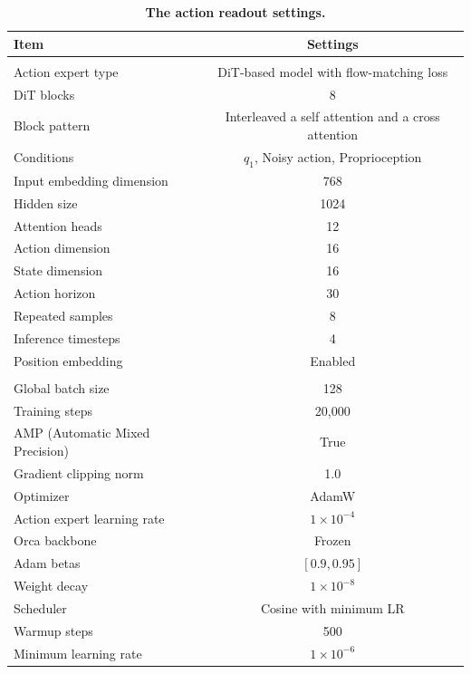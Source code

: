 \begin{table}[!htbp] 
\centering 
\caption{\textbf{The action readout settings.}} \label{tab:appendix_action_readout_settings} 
\begin{tabular}{lc} 
\toprule[1pt]
\textbf{Item} & \textbf{Settings} \\ 
\midrule
\rowcolor[rgb]{ .949,  .949,  .949}\multicolumn{2}{l}{\textit{Architecture}} \\
Action expert type & DiT-based model with flow-matching loss \\ 
DiT blocks & 8 \\ 
Block pattern & Interleaved a self attention and a cross attention \\
Conditions & \(q_{1}\), Noisy action, Proprioception \\ 
Input embedding dimension & 768 \\ 
Hidden size & 1024 \\ 
Attention heads & 12 \\ 
Action dimension & 16 \\ 
State dimension & 16 \\ 
Action horizon & 30 \\ 
Repeated samples & 8 \\ 
Inference timesteps & 4 \\ 
Position embedding & Enabled \\ 
\midrule 
\rowcolor[rgb]{ .949,  .949,  .949}\multicolumn{2}{l}{\textit{Training}} \\
Global batch size & 128 \\ 
Training steps & 20,000 \\ 
AMP (Automatic Mixed Precision) & True \\ 
Gradient clipping norm & 1.0 \\ 
Optimizer & AdamW \\ 
Action expert learning rate & \(1 \times 10^{-4}\) \\ 
Orca backbone & Frozen \\ 
Adam betas & \([0.9, 0.95]\) \\
Weight decay & \(1 \times 10^{-8}\) \\ Scheduler & Cosine with minimum LR \\ Warmup steps & 500 \\ Minimum learning rate & \(1 \times 10^{-6}\) \\ 
\bottomrule[1pt]
\end{tabular}
\end{table}